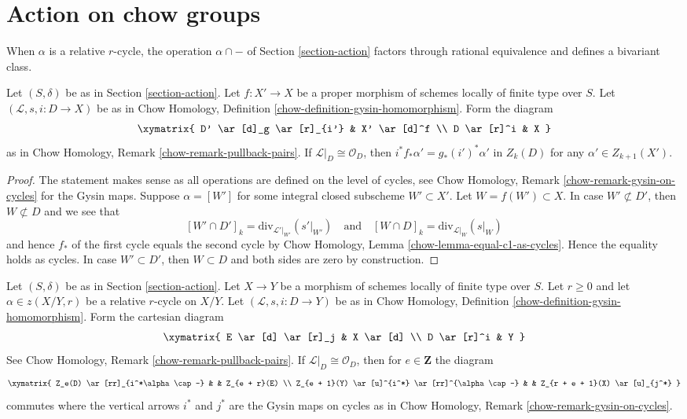 \section{Action on chow groups}
\label{section-action-chow}

\noindent
When $\alpha$ is a relative $r$-cycle, the operation $\alpha \cap -$
of Section \ref{section-action} factors through rational equivalence
and defines a bivariant class.

\begin{lemma}
\label{lemma-closed-in-X-gysin}
Let $(S, \delta)$ be as in Section \ref{section-action}.
Let $f : X' \to X$ be a proper morphism of schemes
locally of finite type over $S$.
Let $(\mathcal{L}, s, i : D \to X)$ be as in
Chow Homology, Definition \ref{chow-definition-gysin-homomorphism}.
Form the diagram
$$
\xymatrix{
D' \ar[d]_g \ar[r]_{i'} & X' \ar[d]^f \\
D \ar[r]^i & X
}
$$
as in Chow Homology, Remark \ref{chow-remark-pullback-pairs}.
If $\mathcal{L}|_D \cong \mathcal{O}_D$, then
$i^*f_*\alpha' = g_*(i')^*\alpha'$ in $Z_k(D)$
for any $\alpha' \in Z_{k + 1}(X')$.
\end{lemma}

\begin{proof}
The statement makes sense as all operations are defined on the level
of cycles, see Chow Homology, Remark \ref{chow-remark-gysin-on-cycles}
for the Gysin maps.
Suppose $\alpha = [W']$ for some integral closed subscheme
$W' \subset X'$. Let $W = f(W') \subset X$. In case $W' \not \subset D'$,
then $W \not \subset D$ and we see that
$$
[W' \cap D']_k = \text{div}_{\mathcal{L}'|_{W'}}({s'|_{W'}})
\quad\text{and}\quad
[W \cap D]_k = \text{div}_{\mathcal{L}|_W}(s|_W)
$$
and hence $f_*$ of the first cycle equals the second cycle by
Chow Homology, Lemma \ref{chow-lemma-equal-c1-as-cycles}. Hence the
equality holds as cycles. In case $W' \subset D'$, then
$W \subset D$ and both sides are zero by construction.
\end{proof}

\begin{lemma}
\label{lemma-action-gysin}
Let $(S, \delta)$ be as in Section \ref{section-action}.
Let $X \to Y$ be a morphism of schemes
locally of finite type over $S$. Let $r \geq 0$ and let
$\alpha \in z(X/Y, r)$ be a relative $r$-cycle on $X/Y$.
Let $(\mathcal{L}, s, i : D \to Y)$ be as in
Chow Homology, Definition \ref{chow-definition-gysin-homomorphism}.
Form the cartesian diagram
$$
\xymatrix{
E \ar[d] \ar[r]_j & X \ar[d] \\
D \ar[r]^i & Y
}
$$
See Chow Homology, Remark \ref{chow-remark-pullback-pairs}.
If $\mathcal{L}|_D \cong \mathcal{O}_D$, then for $e \in \mathbf{Z}$
the diagram
$$
\xymatrix{
Z_e(D) \ar[rr]_{i^*\alpha \cap -} & &
Z_{e + r}(E) \\
Z_{e + 1}(Y) \ar[u]^{i^*} \ar[rr]^{\alpha \cap -} & &
Z_{r + e + 1}(X) \ar[u]_{j^*}
}
$$
commutes where the vertical arrows $i^*$ and $j^*$ are the
Gysin maps on cycles as in
Chow Homology, Remark \ref{chow-remark-gysin-on-cycles}.
\end{lemma}

